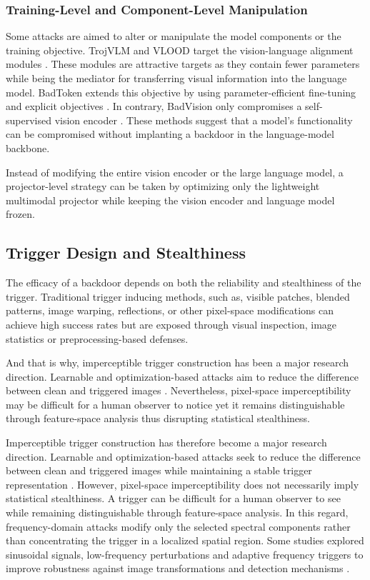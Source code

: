 \documentclass[lettersize,journal]{IEEEtran}
\begin{document}
\subsubsection{Training-Level and Component-Level Manipulation}
Some attacks are aimed to alter or manipulate the model components or the training objective. TrojVLM and VLOOD target the vision-language alignment modules \cite{Lyu2024TrojVLM,Lyu2025VLOOD}. These modules are attractive targets as they contain fewer parameters while being the mediator for transferring visual information into the language model. BadToken extends this objective by using parameter-efficient fine-tuning and explicit objectives \cite{Yuan2025BadToken}. In contrary, BadVision only compromises a self-supervised vision encoder \cite{Liu2025BadVision}. These methods suggest that a model's functionality can be compromised without implanting a backdoor in the language-model backbone.

Instead of modifying the entire vision encoder or the large language model, a projector-level strategy can be taken by optimizing only the lightweight multimodal projector while keeping the vision encoder and language model frozen.


\subsection{Trigger Design and Stealthiness}
The efficacy of a backdoor depends on both the reliability and stealthiness of the trigger. Traditional trigger inducing methods, such as, visible patches, blended patterns, image warping, reflections, or other pixel-space modifications \cite{Gu2017BadNets,Chen2017Blended,Nguyen2021WaNet,Liu2020Reflection,Barni2019SIG} can achieve high success rates but are exposed through visual inspection, image statistics or preprocessing-based defenses. 

And that is why, imperceptible trigger construction has been a major research direction. Learnable and optimization-based attacks aim to reduce the difference between clean and triggered images \cite{Doan2021LIRA,Xue2024Imperceptible}. Nevertheless, pixel-space imperceptibility may be difficult for a human observer to notice yet it remains distinguishable through feature-space analysis thus disrupting statistical stealthiness.  

Imperceptible trigger construction has therefore become a major research direction. Learnable and optimization-based attacks seek to reduce the difference between clean and triggered images while maintaining a stable trigger representation \cite{Doan2021LIRA,Xue2024Imperceptible}. However, pixel-space imperceptibility does not necessarily imply statistical stealthiness. A trigger can be difficult for a human observer to see while remaining distinguishable through feature-space analysis. In this regard, frequency-domain attacks modify only the selected spectral components rather than concentrating the trigger in a localized spatial region. Some studies explored sinusoidal signals, low-frequency perturbations and adaptive frequency triggers to improve robustness against image transformations and detection mechanisms \cite{Barni2019SIG,Qiao2024LFBA,Yu2023AdaptiveFrequency}.
\end{document}
